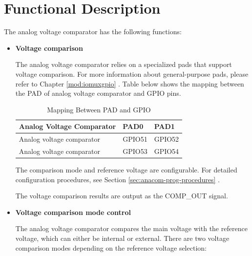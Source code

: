 \documentclass[main\_\_EN.tex]{subfiles}
\begin{document}

\section{Functional Description}
\label{sec:anacom-func-descr}

The analog voltage comparator has the following functions:

\begin{itemize}

    \item {\bfseries Voltage comparison}
    
          The analog voltage comparator relies on a specialized pads that support voltage comparison. For more information about general-purpose pads, please refer to Chapter \ref{mod:iomuxgpio} . Table below shows the mapping between the PAD of analog voltage comparator  and GPIO pins. 
          
          \begin{longtable}{ | L{5.5cm} | L{2cm} | L{2cm} | }
          \caption{Mapping Between PAD and GPIO} \label{tab:anacom-pad-gpio-mapping}\\ \hline
          \textbf{Analog Voltage Comparator} & \textbf{PAD0}  &  \textbf{PAD1}\\ \hline
          Analog voltage comparator  & GPIO51  &  GPIO52  \\ \hline
          Analog voltage comparator  & GPIO53  & GPIO54   \\ \hline
          \end{longtable}
         
          The comparison mode and reference voltage are configurable. For detailed configuration procedures, see Section \ref{sec:anacom-prog-procedures} .
         
          The voltage comparison results are output as the COMP\_OUT signal.

    \item {\bfseries Voltage comparison mode control}

          The analog voltage comparator compares the main voltage with the reference voltage, which can either be internal or external. There are two voltage comparison modes depending on the reference voltage selection:


\end{itemize}
\end{document}
